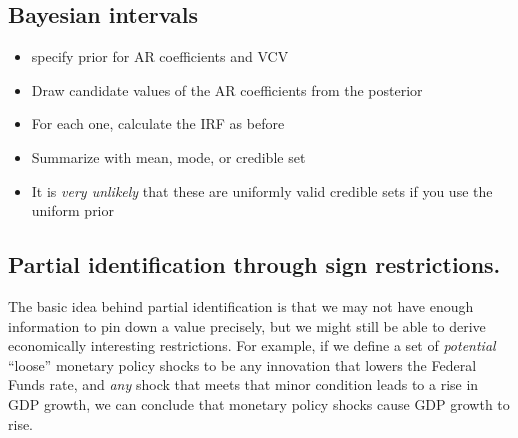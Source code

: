 \subsection{Bayesian intervals}
\begin{itemize}
\item specify prior for AR coefficients and VCV
\item Draw candidate values of the AR coefficients from the posterior
\item For each one, calculate the IRF as before
\item Summarize with mean, mode, or credible set
\item It is \emph{very unlikely} that these are uniformly valid
  credible sets if you use the uniform prior
\end{itemize}

\subsection{Partial identification through sign restrictions.}

The basic idea behind partial identification is that we may not have
enough information to pin down a value precisely, but we might still
be able to derive economically interesting restrictions.  For example,
if we define a set of \emph{potential} ``loose'' monetary policy
shocks to be any innovation that lowers the Federal Funds rate, and
\emph{any} shock that meets that minor condition leads to a rise in
GDP growth, we can conclude that monetary policy shocks cause GDP
growth to rise.

